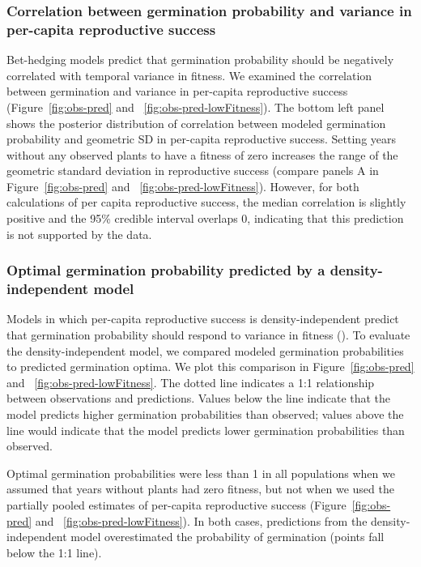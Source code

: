 \documentclass[12pt, oneside, titlepage]{article}   	%
\begin{document}
\subsubsection*{Correlation between germination probability and variance in per-capita reproductive success}

Bet-hedging models predict that germination probability should be negatively correlated with temporal variance in fitness. We examined the correlation between germination and variance in per-capita reproductive success (Figure~\ref{fig:obs-pred} and ~\ref{fig:obs-pred-lowFitness}). The bottom left panel shows the posterior distribution of correlation between modeled germination probability and geometric SD in per-capita reproductive success. Setting years without any observed plants to have a fitness of zero increases the range of the geometric standard deviation in reproductive success (compare panels A in Figure~\ref{fig:obs-pred} and ~\ref{fig:obs-pred-lowFitness}). However, for both calculations of per capita reproductive success, the median correlation is slightly positive and the 95\% credible interval overlaps 0, indicating that this prediction is not supported by the data. 

\subsubsection*{Optimal germination probability predicted by a density-independent model}

Models in which per-capita reproductive success is density-independent predict that germination probability should respond to variance in fitness (\cite{cohen1966}). To evaluate the density-independent model, we compared modeled germination probabilities to predicted germination optima. We plot this comparison in Figure~\ref{fig:obs-pred} and ~\ref{fig:obs-pred-lowFitness}. The dotted line indicates a 1:1 relationship between observations and predictions. Values below the line indicate that the model predicts higher germination probabilities than observed; values above the line would indicate that the model predicts lower germination probabilities than observed.

Optimal germination probabilities were less than 1 in all populations when we assumed that years without plants had zero fitness, but not when we used the partially pooled estimates of per-capita reproductive success (Figure~\ref{fig:obs-pred} and ~\ref{fig:obs-pred-lowFitness}). In both cases, predictions from the density-independent model overestimated the probability of germination (points fall below the 1:1 line).
\end{document}
